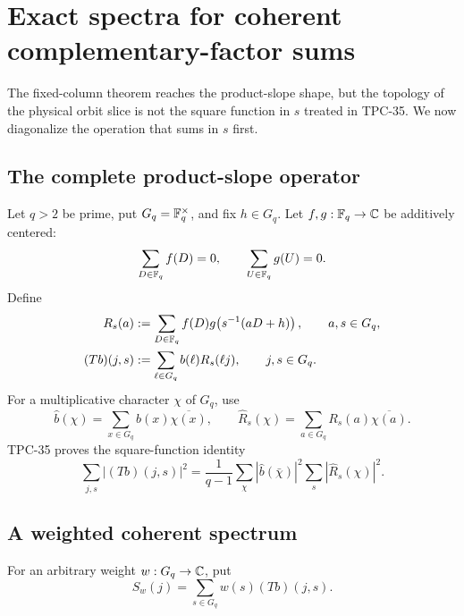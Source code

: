\section{Exact spectra for coherent complementary-factor sums}
\label{sec:tpc36-coherent-spectrum}

The fixed-column theorem reaches the product-slope shape, but the topology
of the physical orbit slice is not the square function in \(s\) treated in
TPC-35.  We now diagonalize the operation that sums in \(s\) first.

\subsection{The complete product-slope operator}

Let \(q>2\) be prime, put \(G_q=\mathbb F_q^\times\), and fix \(h\in G_q\).
Let \(f,g:\mathbb F_q\to\mathbb C\) be additively centered:
\begin{equation}
 \sum_{D\in\mathbb F_q}f(D)=0,
 \qquad
 \sum_{U\in\mathbb F_q}g(U)=0.
 \label{eq:tpc36-centered-fg}
\end{equation}
Define
\begin{align}
 R_s(a)
 &:=\sum_{D\in\mathbb F_q}f(D)
 g\!\left(s^{-1}(aD+h)\right),
 \qquad a,s\in G_q,
 \label{eq:tpc36-Rsa}\\
 (Tb)(j,s)
 &:=\sum_{\ell\in G_q}b(\ell)R_s(\ell j),
 \qquad j,s\in G_q.
 \label{eq:tpc36-Tb}
\end{align}
For a multiplicative character \(\chi\) of \(G_q\), use
\begin{equation}
 \widehat b(\chi)=\sum_{x\in G_q}b(x)\overline{\chi(x)},
 \qquad
 \widehat R_s(\chi)=\sum_{a\in G_q}R_s(a)\overline{\chi(a)}.
 \label{eq:tpc36-multiplicative-transforms}
\end{equation}
TPC-35 proves the square-function identity
\begin{equation}
 \sum_{j,s}|(Tb)(j,s)|^2
 =\frac1{q-1}\sum_\chi
 |\widehat b(\bar\chi)|^2
 \sum_s|\widehat R_s(\chi)|^2.
 \label{eq:tpc36-TPC35-square-spectrum}
\end{equation}

\subsection{A weighted coherent spectrum}

For an arbitrary weight \(w:G_q\to\mathbb C\), put
\begin{equation}
 S_w(j)=\sum_{s\in G_q}w(s)(Tb)(j,s).
 \label{eq:tpc36-Sw}
\end{equation}

